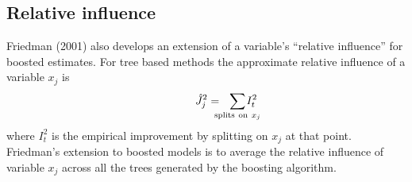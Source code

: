 \documentclass{article}
\begin{document}
\subsection{Relative influence} Friedman (2001) also develops an extension of a variable's ``relative influence'' for boosted estimates. For tree based methods the approximate relative influence of a variable $x_j$ is
\begin{equation} 
\label{RelInfluence} 
\hspace{0.5in} 
\hat J_j^2 = \hspace{-0.1in}\sum_{\mathrm{splits~on~}x_j}\hspace{-0.2in}I_t^2
\end{equation} where $I_t^2$ is the empirical improvement by splitting on $x_j$ at that point. Friedman's extension to boosted models is to average the relative influence of variable $x_j$ across all the trees generated by the boosting algorithm.
\end{document}
